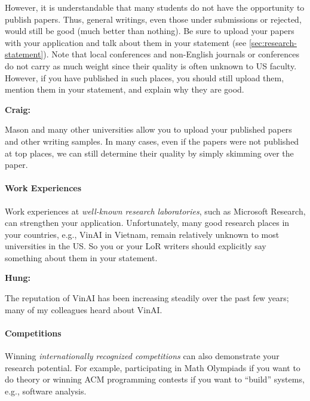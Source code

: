 \documentclass[oneside,11pt,dvipsnames]{book}
\newenvironment{commentbox}[1][]{
  \small
  \begin{mybox}
    {\small \textbf{#1}}
  }{
  \end{mybox}
}
\begin{document}
However, it is understandable that many students do not have the opportunity to publish papers. Thus, general writings, even those under submissions or rejected, would still be good (much better than nothing).  Be sure to upload your papers with your application and talk about them in your statement (see \autoref{sec:research-statement}).  Note that local conferences and non-English journals or conferences do
not carry as much weight since their quality is often unknown to US faculty. However, if you have published in such places, you should still upload them, mention them in your statement, and explain why they are good.




\begin{commentbox}[Craig:]
  Mason and many other universities allow you to upload your published papers and other writing samples. In many cases, even if the papers were not published at top places, we can still determine their quality by simply skimming over the paper.
\end{commentbox}

\paragraph{Work Experiences} Work experiences at \emph{well-known research laboratories}, such as Microsoft Research, can strengthen your
application.  Unfortunately, many good research places in your countries, e.g., VinAI in Vietnam, remain relatively unknown to most universities in the US. So you or your LoR writers should explicitly say something about them in your statement.


\begin{commentbox}[Hung:]
  The reputation of VinAI has been increasing steadily over the past few years; many of my colleagues heard about VinAI.
\end{commentbox}

\paragraph{Competitions} Winning \emph{internationally recognized competitions} can also demonstrate your research potential.
For example, participating in Math Olympiads if you want to do theory or winning ACM programming contests if you want to ``build'' systems, e.g., software analysis.
\end{document}
